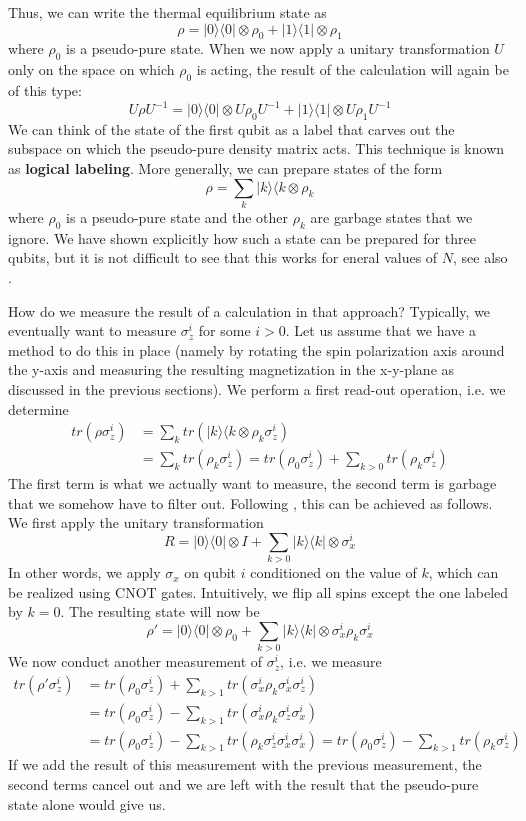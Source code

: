 \documentclass[a4paper, draft]{article}
\theoremstyle{own}
\theoremstyle{remark}
\begin{document}
Thus, we can write the thermal equilibrium state as
$$
\rho = |0 \rangle \langle 0 | \otimes \rho_0 + |1 \rangle \langle 1 | \otimes \rho_1
$$
where $\rho_0$ is a pseudo-pure state. When we now apply a unitary transformation $U$ only on the space on which $\rho_0$ is acting, the result of the calculation will again be of this type:
$$
U\rho U^{-1} = |0 \rangle \langle 0 | \otimes U\rho_0U^{-1} + |1 \rangle \langle 1 | \otimes U\rho_1U^{-1}
$$
We can think of the state of the first qubit as a label that carves out the subspace on which the pseudo-pure density matrix acts. This technique is known as {\bf logical labeling}. More generally, we can prepare states of the form
$$
\rho = \sum_k |k \rangle \langle k \otimes \rho_k
$$ 
where $\rho_0$ is a pseudo-pure state and the other $\rho_k$ are garbage states that we ignore. We have shown explicitly how such a state can be prepared for three qubits, but it is not difficult to see that this works for eneral values of $N$, see also \cite{ChuangEtAl}. 

How do we measure the result of a calculation in that approach? Typically, we eventually want to measure $\sigma_z^i$ for some $i > 0$. Let us assume that we have a method to do this in place (namely by rotating the spin polarization axis around the y-axis and measuring the resulting magnetization in the x-y-plane as discussed in the previous sections). We perform a first read-out operation, i.e. we determine
\begin{align*}
tr(\rho \sigma_z^i) &= \sum_k tr(|k \rangle \langle k \otimes \rho_k \sigma_z^i)  \\
&= \sum_k tr(\rho_k \sigma_z^i) = tr(\rho_0 \sigma_z^i) + \sum_{k > 0} tr(\rho_k \sigma_z^i)
\end{align*}
The first term is what we actually want to measure, the second term is garbage that we somehow have to filter out. Following \cite{ChuangEtAl}, this can be achieved as follows. We first apply the unitary transformation
$$
R =  |0 \rangle \langle 0 | \otimes I + \sum_{k > 0}   |k \rangle \langle k | \otimes \sigma_x^i  
$$
In other words, we apply $\sigma_x$ on qubit $i$ conditioned on the value of $k$, which can be realized using CNOT gates. Intuitively, we flip all spins except the one labeled by $k = 0$. The resulting state will now be 
$$
\rho' = |0 \rangle \langle 0 | \otimes \rho_0 + 
\sum_{k > 0} |k \rangle \langle k| \otimes \sigma_x^i \rho_k \sigma_x^i
$$
We now conduct another measurement of $\sigma_z^i$, i.e. we measure
\begin{align*}
tr(\rho' \sigma_z^i) &= tr(\rho_0 \sigma_z^i) + \sum_{k > 1} tr(\sigma_x^i \rho_k \sigma_x^i \sigma_z^i) \\
&= tr(\rho_0 \sigma_z^i) - \sum_{k > 1} tr(\sigma_x^i \rho_k \sigma_z^i \sigma_x^i ) \\
&= tr(\rho_0 \sigma_z^i) - \sum_{k > 1} tr( \rho_k \sigma_z^i \sigma_x^i \sigma_x^i) 
= tr(\rho_0 \sigma_z^i) - \sum_{k > 1} tr( \rho_k \sigma_z^i)
\end{align*}
If we add the result of this measurement with the previous measurement, the second terms cancel out and we are left with the result that the pseudo-pure state alone would give us. 
\end{document}
